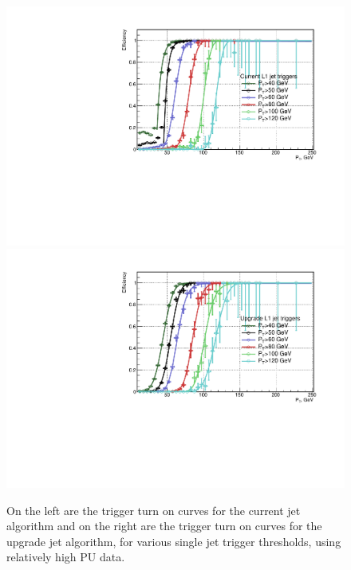 \begin{figure}[t!]
\begin{center}
  \includegraphics[scale=0.37]{Figures/l1jets//CurrentL1JetTriggersHPU.pdf}
    \includegraphics[scale=0.37]{Figures/l1jets//UpgradeL1JetTriggersHPU.pdf}
\caption{On the left are the trigger turn on curves for the current jet algorithm and on the right are the trigger turn on curves for the upgrade jet algorithm, for various single jet trigger thresholds, using relatively high \ac{PU} data.}
\label{JetTO_highPU}
\end{center}
\end{figure}

